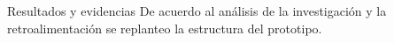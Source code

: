 \documentclass{beamer}
\begin{document}
\begin{frame}[fragile]{}
\begin{columns}[t]
	 \begin{column}{0.46\linewidth}
	 	\begin{block}{Resultados y evidencias}
	 	De acuerdo al análisis de la investigación y la retroalimentación se replanteo la estructura del prototipo.
	 	\begin{figure}[H]
	 		\centering

\end{figure}
\end{block}
\end{column}
\end{columns}
\end{frame}
\end{document}
